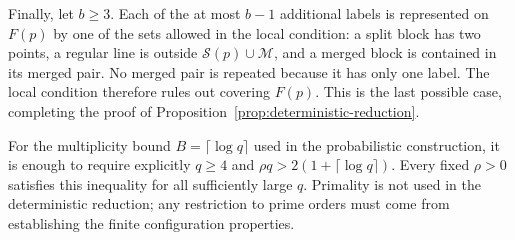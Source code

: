 Finally, let $b\geq3$.  Each of the at most $b-1$ additional labels is
represented on $F(p)$ by one of the sets allowed in the local condition:
a split block has two points, a regular line is outside
$\mathcal S(p)\cup\mathcal M$, and a merged block is contained in its
merged pair.  No merged pair is repeated because it has only one label.
The local condition therefore rules out covering $F(p)$.  This is the
last possible case, completing the proof of
Proposition~\ref{prop:deterministic-reduction}.

\begin{remark}
For the multiplicity bound $B=\lceil\log q\rceil$ used in the
probabilistic construction, it is enough to require explicitly
$q\geq4$ and $\rho q>2(1+\lceil\log q\rceil)$.  Every fixed
$\rho>0$ satisfies this inequality for all sufficiently large $q$.
Primality is not used in the deterministic reduction; any restriction
to prime orders must come from establishing the finite configuration
properties.
\end{remark}
